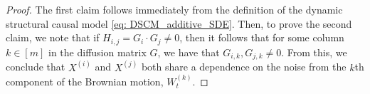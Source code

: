\documentclass[twoside,11pt]{article}
\begin{document}
\begin{proof}
The first claim follows immediately from the definition of the dynamic  structural causal model \eqref{eq: DSCM_additive_SDE}. 
Then, to prove the second claim, we note that if $H_{i,j} = G_i \cdot G_j  \neq 0$, then it follows that for some column $k \in [m]$ in the diffusion matrix $G$, we have that $G_{i,k}, G_{j,k} \neq 0$. From this, we conclude that $X^{(i)}$ and $X^{(j)}$ both share a dependence on the noise from the $k$th component of the Brownian motion, $W_t^{(k)}$.





\end{proof}
\end{document}

